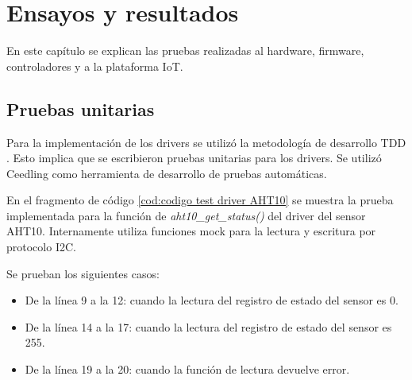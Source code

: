 
\chapter{Ensayos y resultados} %
En este capítulo se explican las pruebas realizadas al hardware, firmware, controladores y a la plataforma IoT.
\label{Chapter4} %


\section{Pruebas unitarias}
Para la implementación de los drivers se utilizó la metodología de desarrollo TDD \citep{METODOLOGIA_TDD}. Esto implica que se escribieron pruebas unitarias para los drivers. Se utilizó Ceedling como herramienta de desarrollo de pruebas automáticas.

En el fragmento de código \ref{cod:codigo test driver AHT10} se muestra la prueba implementada para la función de \emph{aht10\_get\_status()} del driver del sensor AHT10. Internamente utiliza funciones mock para la lectura y escritura por protocolo I2C. 

Se prueban los siguientes casos: 
\begin{itemize}
  \item De la línea 9 a la 12: cuando la lectura del registro de estado del sensor es 0.
  \item De la línea 14 a la 17: cuando la lectura del registro de estado del sensor es 255.
  \item De la línea 19 a la 20: cuando la función de lectura devuelve error. 
\end{itemize}


